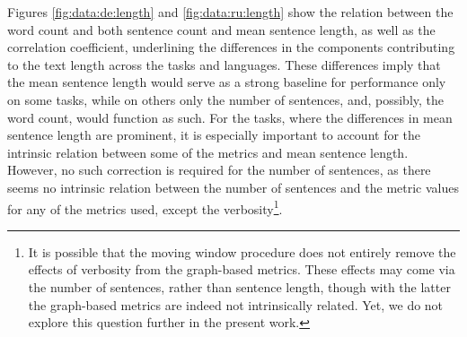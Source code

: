 Figures \ref{fig:data:de:length} and \ref{fig:data:ru:length} show the relation between the word count and both sentence count and mean sentence length, as well as the correlation coefficient, underlining the differences in the components contributing to the text length across the tasks and languages. These differences imply that the mean sentence length would serve as a strong baseline for performance only on some tasks, while on others only the number of sentences, and, possibly, the word count, would function as such. For the tasks, where the differences in mean sentence length are prominent, it is especially important to account for the intrinsic relation between some of the metrics and mean sentence length. However, no such correction is required for the number of sentences, as there seems no intrinsic relation between the number of sentences and the metric values for any of the metrics used, except the verbosity\footnote{It is possible that the moving window procedure does not entirely remove the effects of verbosity from the graph-based metrics. These effects may come via the number of sentences, rather than sentence length, though with the latter the graph-based metrics are indeed not intrinsically related. Yet, we do not explore this question further in the present work.}.

